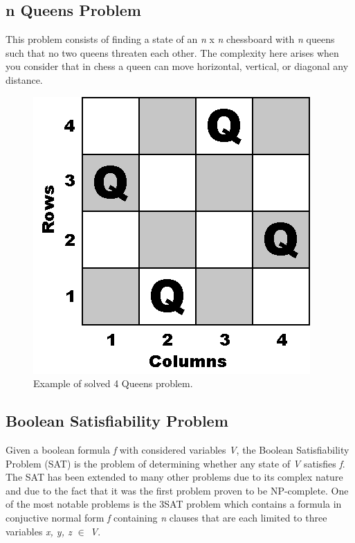 \documentclass[10pt,twoside]{IEEEtran}
\begin{document}
\subsection{n Queens Problem}
This problem consists of finding a state of an \emph{n} x \emph{n} chessboard with \emph{n} queens such that no two queens threaten each other. The complexity here arises when you consider that in chess a queen can move horizontal, vertical, or diagonal any distance.

\begin{figure}[h]
	\centering
	\includegraphics[width=0.7\linewidth]{../diagrams/nqueens.png}
	\caption{Example of solved 4 Queens problem.}
	\label{Nqueen fig}
\end{figure}

\subsection{Boolean Satisfiability Problem}
Given a boolean formula \emph{f} with considered variables \emph{V}, the Boolean Satisfiability Problem (SAT) is the problem of determining whether any state of \emph{V} satisfies \emph{f}. The SAT has been extended to many other problems due to its complex nature and due to the fact that it was the first problem proven to be NP-complete. One of the most notable problems is the 3SAT problem which contains a formula in conjuctive normal form \emph{f} containing \emph{n} clauses that are each limited to three variables \emph{x, y, z ${\in}$ V}.
\end{document}
